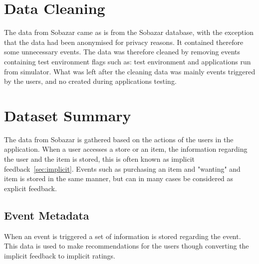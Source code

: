 \section{Data Cleaning}
    The data from Sobazar came as is from the Sobazar database, with the exception that the data had been anonymised for privacy reasons.
    It contained therefore some unnecessary events.
    The data was therefore cleaned by removing events containing test environment flags such as: test environment and applications run from simulator.
    What was left after the cleaning data was mainly events triggered by the users, and no created during applications testing.


\section{Dataset Summary}
    The data from Sobazar is gathered based on the actions of the users in the application.
    When a user accesses a store or an item, the information regarding the user and the item is stored, this is often known as implicit feedback~\ref{sec:implicit}.
    Events such as purchasing an item and "wanting" and item is stored in the same manner, but can in many cases be considered as explicit feedback.

\subsection{Event Metadata}
    When an event is triggered a set of information is stored regarding the event.
    This data is used to make recommendations for the users though converting the implicit feedback to implicit ratings.


